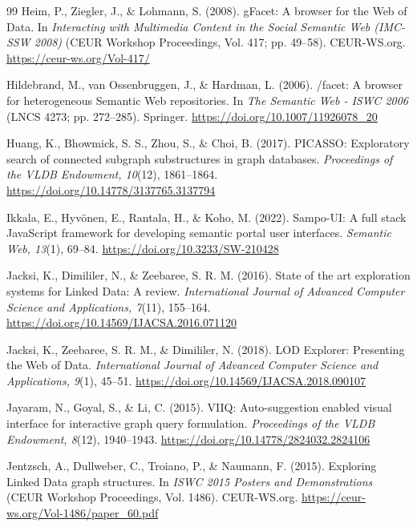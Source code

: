 \documentclass[manuscript,review,screen]{acmart}
\begin{document}
\begin{thebibliography}{99}
 Heim, P., Ziegler, J., \& Lohmann, S. (2008). gFacet: A browser for the Web of Data. In \textit{Interacting with Multimedia Content in the Social Semantic Web (IMC-SSW 2008)} (CEUR Workshop Proceedings, Vol. 417; pp. 49--58). CEUR-WS.org. \url{https://ceur-ws.org/Vol-417/}

 Hildebrand, M., van Ossenbruggen, J., \& Hardman, L. (2006). /facet: A browser for heterogeneous Semantic Web repositories. In \textit{The Semantic Web - ISWC 2006} (LNCS 4273; pp. 272--285). Springer. \url{https://doi.org/10.1007/11926078_20}

 Huang, K., Bhowmick, S. S., Zhou, S., \& Choi, B. (2017). PICASSO: Exploratory search of connected subgraph substructures in graph databases. \textit{Proceedings of the VLDB Endowment, 10}(12), 1861--1864. \url{https://doi.org/10.14778/3137765.3137794}

 Ikkala, E., Hyv\"{o}nen, E., Rantala, H., \& Koho, M. (2022). Sampo-UI: A full stack JavaScript framework for developing semantic portal user interfaces. \textit{Semantic Web, 13}(1), 69--84. \url{https://doi.org/10.3233/SW-210428}

 Jacksi, K., Dimililer, N., \& Zeebaree, S. R. M. (2016). State of the art exploration systems for Linked Data: A review. \textit{International Journal of Advanced Computer Science and Applications, 7}(11), 155--164. \url{https://doi.org/10.14569/IJACSA.2016.071120}

 Jacksi, K., Zeebaree, S. R. M., \& Dimililer, N. (2018). LOD Explorer: Presenting the Web of Data. \textit{International Journal of Advanced Computer Science and Applications, 9}(1), 45--51. \url{https://doi.org/10.14569/IJACSA.2018.090107}

 Jayaram, N., Goyal, S., \& Li, C. (2015). VIIQ: Auto-suggestion enabled visual interface for interactive graph query formulation. \textit{Proceedings of the VLDB Endowment, 8}(12), 1940--1943. \url{https://doi.org/10.14778/2824032.2824106}

 Jentzsch, A., Dullweber, C., Troiano, P., \& Naumann, F. (2015). Exploring Linked Data graph structures. In \textit{ISWC 2015 Posters and Demonstrations} (CEUR Workshop Proceedings, Vol. 1486). CEUR-WS.org. \url{https://ceur-ws.org/Vol-1486/paper_60.pdf}


\end{thebibliography}
\end{document}
